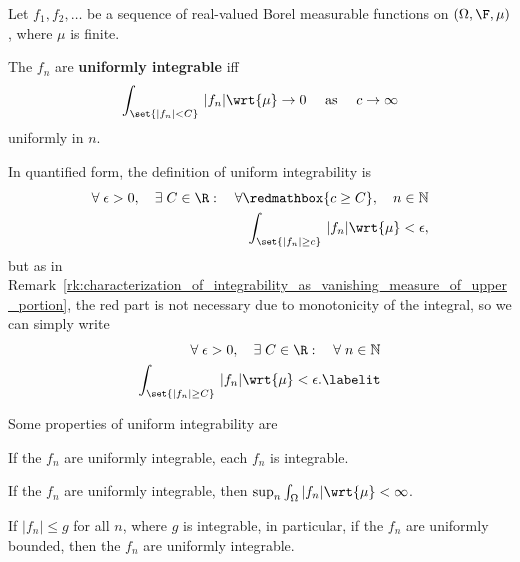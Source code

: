 \documentclass{article} %
\begin{document}
\begin{definition}
Let $f_1, f_2, \hdots$ be a sequence of real-valued Borel measurable functions on $(\Omega, \F, \mu)$, where $\mu$ is finite.

The $f_n$ are \textbf{uniformly integrable} iff 
\[ \int_{\set{|f_n| <C}} \, |f_n| \wrt{\mu} \to 0 \quad \text{ as } \quad c \to \infty \]
uniformly in $n$.
\label{def:uniform_integrability}
\end{definition}

\begin{remark}
In quantified form, the definition of uniform integrability is 
%
\begin{align*}
\forall \; \epsilon >0, \quad  \exists \; C \in \R : \quad \forall \redmathbox{c \geq C}, \quad n \in \mathbb{N} \\
\int_{\set{|f_n| \geq c}} \, |f_n| \wrt{\mu} < \epsilon,
\end{align*}
but as in Remark~\ref{rk:characterization_of_integrability_as_vanishing_measure_of_upper_portion}, the red part is not necessary due to monotonicity of the integral, so we can simply write
%
\begin{align*}
\forall \; \epsilon >0, \quad  \exists \; C \in \R : \quad \forall \; n \in \mathbb{N} \\
\int_{\set{|f_n| \geq C}} \, |f_n| \wrt{\mu} < \epsilon. \labelit \label{eqn:uniform_integrability_in_quantified_form}
\end{align*}
\end{remark}

\begin{proposition}
Some properties of uniform integrability are
%
\begin{alphabate}
\item If the $f_n$ are uniformly integrable, each $f_n$ is integrable.
\item If the $f_n$ are uniformly integrable, then $\sup_n \int_\Omega |f_n| \wrt{\mu} < \infty$.	
\item If $|f_n| \leq g$ for all $n$, where $g$ is integrable, in particular, if the $f_n$ are uniformly bounded, then the $f_n$ are uniformly integrable.
\end{alphabate}
\end{proposition}
\end{document}
